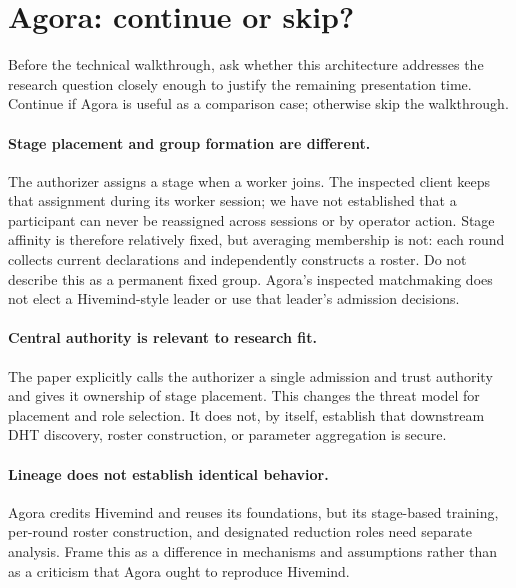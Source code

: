 \section*{Agora: continue or skip?}

Before the technical walkthrough, ask whether this architecture addresses the
research question closely enough to justify the remaining presentation time.
Continue if Agora is useful as a comparison case; otherwise skip the walkthrough.

\paragraph{Stage placement and group formation are different.}
The authorizer assigns a stage when a worker joins. The inspected client keeps
that assignment during its worker session; we have not established that a
participant can never be reassigned across sessions or by operator action.
Stage affinity is therefore relatively fixed, but averaging membership is not:
each round collects current declarations and independently constructs a roster.
Do not describe this as a permanent fixed group. Agora's inspected matchmaking
does not elect a Hivemind-style leader or use that leader's admission decisions.

\paragraph{Central authority is relevant to research fit.}
The paper explicitly calls the authorizer a single admission and trust authority
and gives it ownership of stage placement. This changes the threat model for
placement and role selection. It does not, by itself, establish that downstream
DHT discovery, roster construction, or parameter aggregation is secure.

\paragraph{Lineage does not establish identical behavior.}
Agora credits Hivemind and reuses its foundations, but its stage-based training,
per-round roster construction, and designated reduction roles need separate
analysis. Frame this as a difference in mechanisms and assumptions rather than
as a criticism that Agora ought to reproduce Hivemind.

